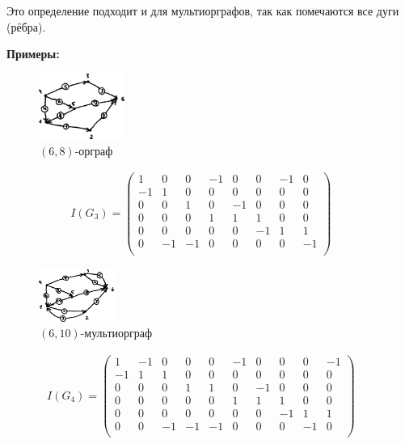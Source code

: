 \documentclass[12pt, a4paper]{article}
\begin{document}
Это определение подходит и для мультиорграфов, так как помечаются все дуги (рёбра).

\textbf{Примеры:}

\begin{figure}
  \centering
  \vspace{-8mm}
  \includegraphics[width=0.25\textwidth]{48}
  \vspace{-6mm}
 \caption{$(6,8)$-орграф}
\end{figure}

\begin{align*}
I(G_3) = \begin{pmatrix}
1 & 0 & 0 & -1 & 0 & 0 & -1 & 0 \\
-1 & 1 & 0 & 0 & 0 & 0 & 0 & 0 \\
0 & 0 & 1 & 0 & -1 & 0 & 0 & 0 \\
0 & 0 & 0 & 1 & 1 & 1 & 0 & 0 \\
0 & 0 & 0 & 0 & 0 & -1 & 1 & 1 \\
0 & -1 & -1 & 0 & 0 & 0 & 0 & -1 \\
\end{pmatrix} &&
\end{align*}

\begin{figure}
  \centering
  \vspace{-2mm}
  \includegraphics[width=0.22\textwidth]{49}
  \vspace{-5mm}
 \caption{$(6,10)$-мультиорграф}
\end{figure}

\begin{align*}
I(G_4) = \begin{pmatrix}
1 & -1 & 0 & 0 & 0 & -1 & 0 & 0 & 0 & -1 \\
-1 & 1 & 1 & 0 & 0 & 0 & 0 & 0 & 0 & 0 \\
0 & 0 & 0 & 1 & 1 & 0 & -1 & 0 & 0 & 0 \\
0 & 0 & 0 & 0 & 0 & 1 & 1 & 1 & 0 & 0 \\
0 & 0 & 0 & 0 & 0 & 0 & 0 & -1 & 1 & 1 \\
0 & 0 & -1 & -1 & -1 & 0 & 0 & 0 & -1 & 0 \\
\end{pmatrix} &&
\end{align*}
\end{document}
